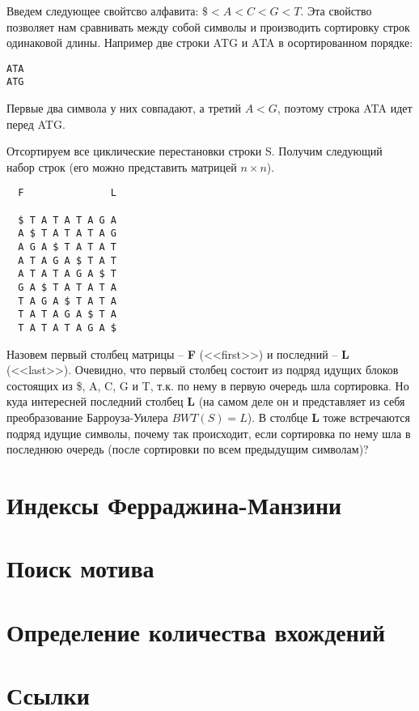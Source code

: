 \documentclass[letterpaper, 11pt]{article}
\begin{document}
Введем следующее свойтсво алфавита: $\$ < A < C < G < T$. Эта свойство позволяет нам сравнивать между собой символы и производить сортировку строк одинаковой длины. Например две строки ATG и ATA в осортированном порядке:

\begin{verbatim}
ATA
ATG
\end{verbatim}

Первые два символа у них совпадают, а третий $A < G$, поэтому строка ATA идет перед ATG.

Отсортируем все циклические перестановки строки S. Получим следующий набор строк (его можно представить матрицей $n \times n$).

\begin{verbatim}
  F               L
  
  $ T A T A T A G A
  A $ T A T A T A G
  A G A $ T A T A T
  A T A G A $ T A T
  A T A T A G A $ T
  G A $ T A T A T A
  T A G A $ T A T A
  T A T A G A $ T A
  T A T A T A G A $
\end{verbatim}

Назовем первый столбец матрицы -- \textbf{F} (<<first>>) и последний -- \textbf{L} (<<last>>). Очевидно, что первый столбец состоит из подряд идущих блоков состоящих из \$, A, C, G и T, т.к. по нему в первую очередь шла сортировка. Но куда интересней последний столбец \textbf{L} (на самом деле он и представляет из себя преобразование Барроуза-Уилера $BWT(S) = L$). В столбце \textbf{L} тоже встречаются подряд идущие символы, почему так происходит, если сортировка по нему шла в последнюю очередь (после сортировки по всем предыдущим символам)?

\section{Индексы Ферраджина-Манзини}
\section{Поиск мотива}
\section{Определение количества вхождений}
\section{Ссылки}

\begingroup
\renewcommand{\section}[2]{}%
\begin{thebibliography}{7}


\end{thebibliography}
\endgroup
\end{document}
